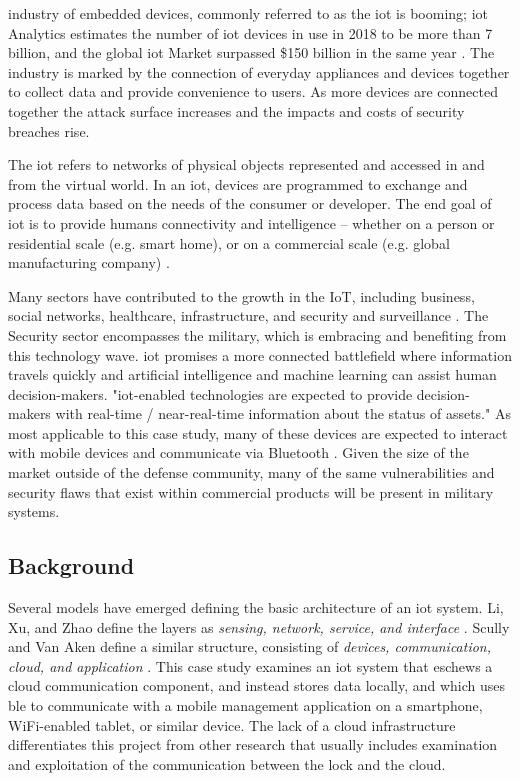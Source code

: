 \documentclass[conference]{IEEEtran}
\begin{document}
 industry of embedded devices, commonly referred to as the \gls{iot} is booming; \gls{iot} Analytics estimates the number of \gls{iot} devices in use in 2018 to be more than 7 billion, and the global \gls{iot} Market surpassed \$150 billion in the same year \cite{Scully2017}. The industry is marked by the connection of everyday appliances and devices together to collect data and provide convenience to users. As more devices are connected together the attack surface increases and the impacts and costs of security breaches rise.

\bigskip

The \gls{iot} refers to networks of physical objects represented and accessed in and from the virtual world. In an \gls{iot}, devices are programmed to exchange and process data based on the needs of the consumer or developer. The end goal of \gls{iot} is to provide humans connectivity and intelligence -- whether on a person or residential scale (e.g. smart home), or on a commercial scale (e.g. global manufacturing company) \cite{Li2015}. 

\bigskip

Many sectors have contributed to the growth in the IoT, including business, social networks, healthcare, infrastructure, and security and surveillance \cite{Li2015}. The Security sector encompasses the military, which is embracing and benefiting from this technology wave. \gls{iot} promises a more connected battlefield where information travels quickly and artificial intelligence and machine learning can assist human decision-makers. "\gls{iot}-enabled technologies are expected to provide decision-makers with real-time / near-real-time information about the status of assets." As most applicable to this case study, many of these devices are expected to interact with mobile devices and communicate via Bluetooth  \cite{Miller}. Given the size of the market outside of the defense community, many of the same vulnerabilities and security flaws that exist within commercial products will be present in military systems. 

\subsection{Background}

Several models have emerged defining the basic architecture of an \gls{iot} system. Li, Xu, and Zhao define the layers as \textit{sensing, network, service, and interface} \cite{Li2015}. Scully and Van Aken define a similar structure, consisting of \textit{devices, communication, cloud, and application}  \cite{Scully2017}. This case study examines an \gls{iot} system that eschews a cloud communication component, and instead stores data locally, and which uses \gls{ble} to communicate with a mobile management application on a smartphone, WiFi-enabled tablet, or similar device.  The lack of a cloud infrastructure differentiates this project from other research that usually includes examination and exploitation of the communication between the lock and the cloud. 
\end{document}
